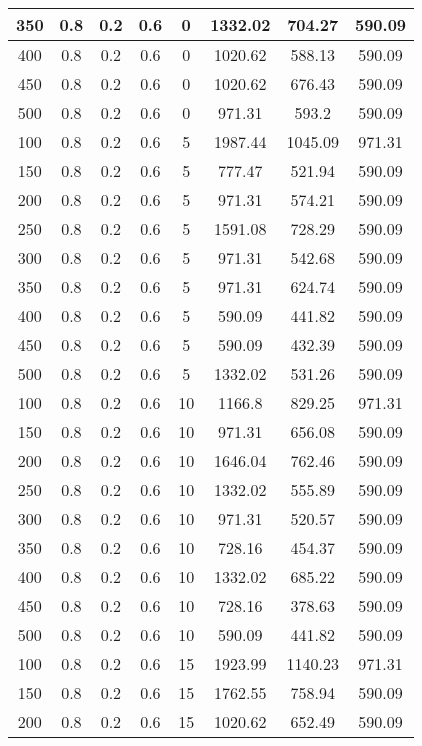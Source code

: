 \documentclass[a4paper, 12pt]{extreport}
\begin{document}
\begin{itemize}
\begin{longtable}{|c|c|c|c|c|c|c|c|}
			350 & 0.8 & 0.2 & 0.6 & 0 & 1332.02 & 704.27 & 590.09 \\\hline
			400 & 0.8 & 0.2 & 0.6 & 0 & 1020.62 & 588.13 & 590.09 \\\hline
			450 & 0.8 & 0.2 & 0.6 & 0 & 1020.62 & 676.43 & 590.09 \\\hline
			500 & 0.8 & 0.2 & 0.6 & 0 & 971.31 & 593.2 & 590.09 \\\hline
			100 & 0.8 & 0.2 & 0.6 & 5 & 1987.44 & 1045.09 & 971.31 \\\hline
			150 & 0.8 & 0.2 & 0.6 & 5 & 777.47 & 521.94 & 590.09 \\\hline
			200 & 0.8 & 0.2 & 0.6 & 5 & 971.31 & 574.21 & 590.09 \\\hline
			250 & 0.8 & 0.2 & 0.6 & 5 & 1591.08 & 728.29 & 590.09 \\\hline
			300 & 0.8 & 0.2 & 0.6 & 5 & 971.31 & 542.68 & 590.09 \\\hline
			350 & 0.8 & 0.2 & 0.6 & 5 & 971.31 & 624.74 & 590.09 \\\hline
			400 & 0.8 & 0.2 & 0.6 & 5 & 590.09 & 441.82 & 590.09 \\\hline
			450 & 0.8 & 0.2 & 0.6 & 5 & 590.09 & 432.39 & 590.09 \\\hline
			500 & 0.8 & 0.2 & 0.6 & 5 & 1332.02 & 531.26 & 590.09 \\\hline
			100 & 0.8 & 0.2 & 0.6 & 10 & 1166.8 & 829.25 & 971.31 \\\hline
			150 & 0.8 & 0.2 & 0.6 & 10 & 971.31 & 656.08 & 590.09 \\\hline
			200 & 0.8 & 0.2 & 0.6 & 10 & 1646.04 & 762.46 & 590.09 \\\hline
			250 & 0.8 & 0.2 & 0.6 & 10 & 1332.02 & 555.89 & 590.09 \\\hline
			300 & 0.8 & 0.2 & 0.6 & 10 & 971.31 & 520.57 & 590.09 \\\hline
			350 & 0.8 & 0.2 & 0.6 & 10 & 728.16 & 454.37 & 590.09 \\\hline
			400 & 0.8 & 0.2 & 0.6 & 10 & 1332.02 & 685.22 & 590.09 \\\hline
			450 & 0.8 & 0.2 & 0.6 & 10 & 728.16 & 378.63 & 590.09 \\\hline
			500 & 0.8 & 0.2 & 0.6 & 10 & 590.09 & 441.82 & 590.09 \\\hline
			100 & 0.8 & 0.2 & 0.6 & 15 & 1923.99 & 1140.23 & 971.31 \\\hline
			150 & 0.8 & 0.2 & 0.6 & 15 & 1762.55 & 758.94 & 590.09 \\\hline
			200 & 0.8 & 0.2 & 0.6 & 15 & 1020.62 & 652.49 & 590.09 \\\hline

\end{longtable}
\end{itemize}
\end{document}

